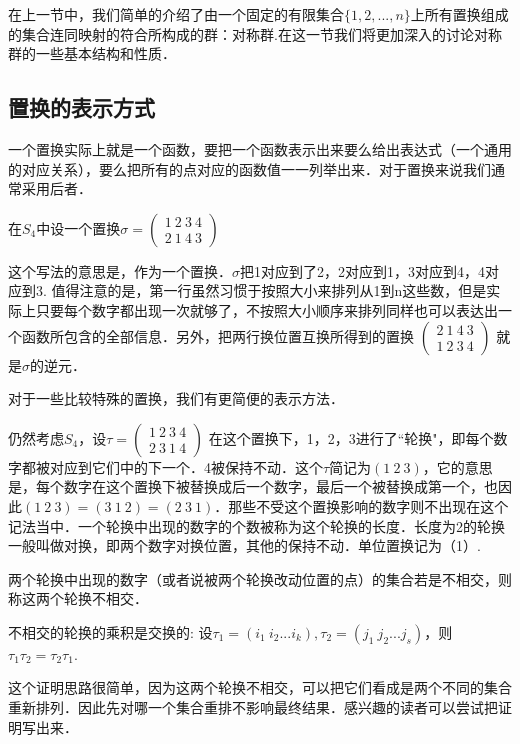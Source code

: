 
  在上一节中，我们简单的介绍了由一个固定的有限集合$\{1, 2, ..., n\}$上所有置换组成的集合连同映射的符合所构成的群：对称群.在这一节我们将更加深入的讨论对称群的一些基本结构和性质．

\subsection{置换的表示方式}
一个置换实际上就是一个函数，要把一个函数表示出来要么给出表达式（一个通用的对应关系），要么把所有的点对应的函数值一一列举出来．对于置换来说我们通常采用后者．
\begin{example}{}
在$S_4$中设一个置换$\sigma=\begin{pmatrix}
1\ 2\ 3\ 4\\ 2\ 1\ 4\ 3
\end{pmatrix}$
\end{example}
这个写法的意思是，作为一个置换．$\sigma$把1对应到了2，2对应到1，3对应到4，4对应到3. 值得注意的是，第一行虽然习惯于按照大小来排列从1到n这些数，但是实际上只要每个数字都出现一次就够了，不按照大小顺序来排列同样也可以表达出一个函数所包含的全部信息．另外，把两行换位置互换所得到的置换
$\begin{pmatrix}
2\ 1\ 4\ 3\\ 1\ 2\ 3\ 4
\end{pmatrix}$
就是$\sigma$的逆元．


对于一些比较特殊的置换，我们有更简便的表示方法．
\begin{example}{}
仍然考虑$S_4$，设$\tau=\begin{pmatrix}
1\ 2\ 3\ 4\\ 2\ 3\ 1\ 4
\end{pmatrix}$ 在这个置换下，1，2，3进行了“轮换"，即每个数字都被对应到它们中的下一个．4被保持不动．这个$\tau$简记为$(1\ 2\ 3)$，它的意思是，每个数字在这个置换下被替换成后一个数字，最后一个被替换成第一个，也因此$(1\ 2\ 3)=(3\ 1\ 2)=(2\ 3\ 1)$．那些不受这个置换影响的数字则不出现在这个记法当中．一个轮换中出现的数字的个数被称为这个轮换的长度．长度为2的轮换一般叫做对换，即两个数字对换位置，其他的保持不动．单位置换记为（1）.
\end{example}

\begin{definition}{}
两个轮换中出现的数字（或者说被两个轮换改动位置的点）的集合若是不相交，则称这两个轮换不相交．
\end{definition}

\begin{lemma}{}
不相交的轮换的乘积是交换的: 设$\tau_1=(i_1\ i_2...i_k), \tau_2=(j_1\ j_2...j_s)$，则$\tau_1\tau_2=\tau_2\tau_1$.
\end{lemma}
这个证明思路很简单，因为这两个轮换不相交，可以把它们看成是两个不同的集合重新排列．因此先对哪一个集合重排不影响最终结果．感兴趣的读者可以尝试把证明写出来．

